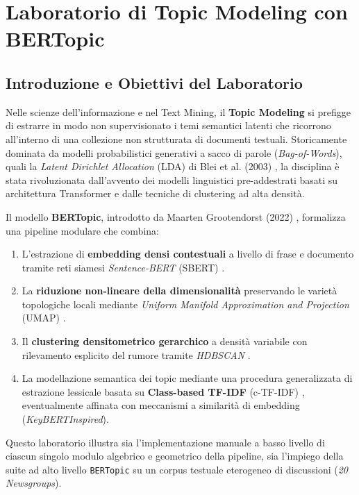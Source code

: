 \chapter{Laboratorio di Topic Modeling con BERTopic}
\label{chap:lab-topic-modeling-bertopic}

\FloatBarrier
\section{Introduzione e Obiettivi del Laboratorio}
\label{sec:lab-bertopic-intro}

Nelle scienze dell'informazione e nel Text Mining, il \textbf{Topic Modeling} si prefigge di estrarre in modo non supervisionato i temi semantici latenti che ricorrono all'interno di una collezione non strutturata di documenti testuali. Storicamente dominata da modelli probabilistici generativi a sacco di parole (\textit{Bag-of-Words}), quali la \textit{Latent Dirichlet Allocation} (LDA) di Blei et al. (2003) \cite{blei2003}, la disciplina è stata rivoluzionata dall'avvento dei modelli linguistici pre-addestrati basati su architettura Transformer e dalle tecniche di clustering ad alta densità.

Il modello \textbf{BERTopic}, introdotto da Maarten Grootendorst (2022) \cite{grootendorst2022}, formalizza una pipeline modulare che combina:
\begin{enumerate}
    \item L'estrazione di \textbf{embedding densi contestuali} a livello di frase e documento tramite reti siamesi \textit{Sentence-BERT} (SBERT) \cite{reimers2019}.
    \item La \textbf{riduzione non-lineare della dimensionalità} preservando le varietà topologiche locali mediante \textit{Uniform Manifold Approximation and Projection} (UMAP) \cite{mcinnes2018}.
    \item Il \textbf{clustering densitometrico gerarchico} a densità variabile con rilevamento esplicito del rumore tramite \textit{HDBSCAN} \cite{campello2015}.
    \item La modellazione semantica dei topic mediante una procedura generalizzata di estrazione lessicale basata su \textbf{Class-based TF-IDF} (c-TF-IDF) \cite{grootendorst2022}, eventualmente affinata con meccanismi a similarità di embedding (\textit{KeyBERTInspired}).
\end{enumerate}

Questo laboratorio illustra sia l'implementazione manuale a basso livello di ciascun singolo modulo algebrico e geometrico della pipeline, sia l'impiego della suite ad alto livello \texttt{BERTopic} su un corpus testuale eterogeneo di discussioni (\textit{20 Newsgroups}).

